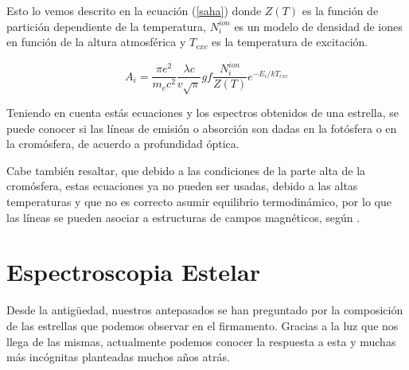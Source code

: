 \documentclass[12pt,oneside,openany,letter]{book}
\begin{document}
\noindent Esto lo vemos descrito en la ecuación (\ref{saha}) donde $Z(T)$ es la función de partición dependiente de la temperatura, $N_i^{ion}$ es un modelo de densidad de iones en función de la altura atmosférica y $T_{exc}$ es la temperatura de excitación.

\begin{equation}
A_{i} = \frac{\pi e^{2}}{m_{e} c^{2}} \frac{\lambda c}{v \sqrt{\pi}} g f \frac{N_{i}^{ion}}{Z(T)} e^{-E_{i} / k T_{exc}}
\label{saha}
\end{equation}

\noindent Teniendo en cuenta estás ecuaciones y los espectros obtenidos de una estrella, se puede conocer si las líneas de emisión o absorción son dadas en la fotósfera o en la cromósfera, de acuerdo a profundidad óptica.

Cabe también resaltar, que debido a las condiciones de la parte alta de la cromósfera,  estas ecuaciones ya no pueden ser usadas, debido a las altas temperaturas y que no es correcto asumir equilibrio termodinámico, por lo que las líneas se pueden asociar a estructuras de campos magnéticos, según \citep{zhang2020magnetic}.

\section{Espectroscopia Estelar}\label{espectroscopia}


\noindent Desde la antigüedad, nuestros antepasados se han preguntado por la composición de las estrellas que podemos observar en el firmamento. Gracias a la luz que nos llega de las mismas, actualmente podemos conocer la respuesta a esta y muchas más incógnitas planteadas muchos años atrás. 
\vspace{2mm}
\end{document}
